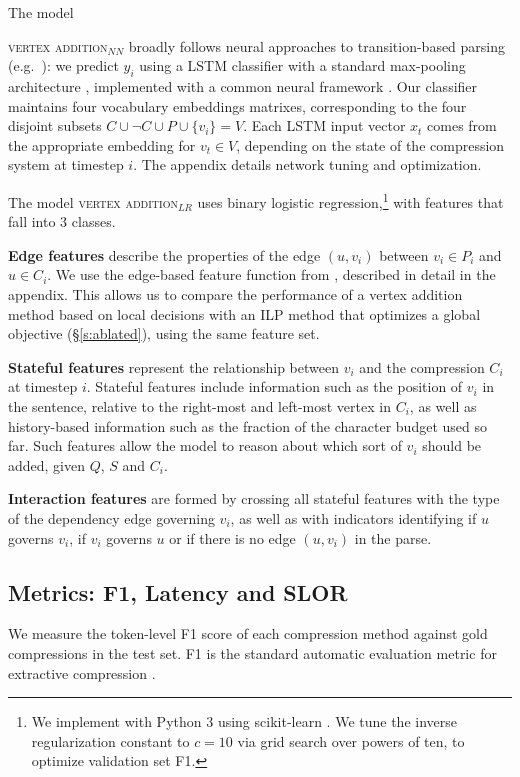 \documentclass[11pt,a4paper]{article}
\begin{document}
The model {\textsc{vertex addition}$_{NN}$ broadly follows neural approaches to transition-based parsing (e.g.\ \citet{D14-1082}): we predict $y_i$ using a LSTM classifier with a standard max-pooling architecture \cite{D17-1070}, implemented with a common neural framework \cite{Gardner2017AllenNLP}. Our classifier maintains four vocabulary embeddings matrixes, corresponding to the four disjoint subsets $C \cup \neg C \cup P \cup \{v_i\} = V$. Each LSTM input vector $x_t$ comes from the appropriate embedding for $v_t \in V$, depending on the state of the compression system at timestep $i$. The appendix details network tuning and  optimization.

The model \textsc{vertex addition}$_{LR}$ uses binary logistic regression,\footnote{We implement with Python 3 using scikit-learn \cite{Pedregosa:2011:SML:1953048.2078195}. We tune the inverse regularization constant to $c=10$ via grid search over powers of ten, to optimize validation set F1.} with features that fall into 3 classes.

\textbf{Edge features} describe the properties of the edge $(u,v_i)$ between $v_i \in P_i$ and $u \in C_i$. We use the edge-based feature function from \citet{filippova2013overcoming}, described in detail in the appendix. This allows us to compare the performance of a vertex addition method based on local decisions with an ILP method that optimizes a global objective (\S \ref{s:ablated}), using the same feature set.

\textbf{Stateful features} represent the relationship between $v_i$ and the compression $C_i$ at timestep $i$. Stateful features include information such as the position of $v_i$ in the sentence, relative to the right-most and left-most vertex in $C_i$, as well as history-based information such as the fraction of the character budget used so far. Such features allow the model to reason about which sort of $v_i$ should be added, given $Q$, $S$ and $C_i$.

\textbf{Interaction features} are formed by crossing all stateful features with the type of the dependency edge governing $v_i$, as well as with indicators identifying if $u$ governs $v_i$, if $v_i$ governs $u$ or if there is no edge $(u,v_i)$ in the parse.

\subsection{Metrics: F1, Latency and SLOR}\label{s:f1}
We measure the token-level F1 score of each compression method against gold compressions in the test set. F1 is the standard automatic evaluation metric for extractive compression \cite{filippova2015sentence,Klerke2016ImprovingSC,Wang2017CanSH}. 

}
\end{document}
